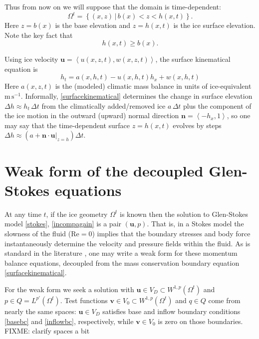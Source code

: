 \documentclass[letterpaper,final,12pt,reqno]{amsart}
\newcommand{\bn}{\mathbf{n}}
\newcommand{\bu}{\mathbf{u}}
\newcommand{\bv}{\mathbf{v}}
\begin{document}
Thus from now on we will suppose that the domain is time-dependent:
\begin{equation}
\Omega^t = \left\{(x,z)\,\big|\, b(x) < z < h(x,t)\right\}.  \label{Omegat}
\end{equation}
Here $z=b(x)$ is the base elevation and $z=h(x,t)$ is the ice surface elevation.  Note the key fact that
\begin{equation}
h(x,t) \ge b(x).  \label{admissibility}
\end{equation}

Using ice velocity $\bu=\left<u(x,z,t),w(x,z,t)\right>$, the surface kinematical equation is
\begin{equation}
h_t = a(x,h,t) - u(x,h,t) h_x + w(x,h,t) \label{surfacekinematical}
\end{equation}
Here $a(x,z,t)$ is the (modeled) climatic mass balance in units of ice-equivalent $\text{m}\,\text{s}^{-1}$.  Informally, \eqref{surfacekinematical} determines the change in surface elevation $\Delta h \approx h_t\,\Delta t$ from the climatically added/removed ice $a\,\Delta t$ plus the component of the ice motion in the outward (upward) normal direction $\bn = \left<-h_x,1\right>$, so one may say that the time-dependent surface $z=h(x,t)$ evolves by steps $\Delta h \approx \left(a + \bn\cdot \bu|_{z=h}\right) \Delta t$.


\section{Weak form of the decoupled Glen-Stokes equations} \label{sec:weakformstokes}

At any time $t$, if the ice geometry $\Omega^t$ is known then the solution to Glen-Stokes model \eqref{stokes}, \eqref{incompagain} is a pair $(\bu,p)$.  That is, in a Stokes model the slowness of the fluid ($\text{Re}=0$) implies that the boundary stresses and body force instantaneously determine the velocity and pressure fields within the fluid.  As is standard in the literature \cite{BuelerBook,JouvetRappaz2011}, one may write a weak form for these momentum balance equations, decoupled from the mass conservation boundary equation \eqref{surfacekinematical}.

For the weak form we seek a solution with $\bu\in V_D \subset W^{1,p}(\Omega^t)$ and $p \in Q=L^{p'}(\Omega^t)$.  Test functions $\bv\in V_0 \subset W^{1,p}(\Omega^t)$ and $q\in Q$ come from nearly the same spaces: $\bu\in V_D$ satisfies base and inflow boundary conditions \eqref{basebc} and \eqref{inflowbc}, respectively, while $\bv\in V_0$ is zero on those boundaries.  FIXME: clarify spaces a bit
\end{document}
